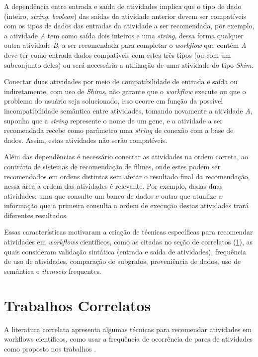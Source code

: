 \documentclass{acm_proc_article-sp}
\begin{document}
A depend{\^e}ncia entre entrada e sa{\'i}da de atividades implica que o tipo de dado (inteiro, \emph{string}, \emph{boolean}) das sa{\'i}das da atividade anterior devem ser compat{\'i}veis com os tipos de dados das entradas da atividade a ser recomendada, por exemplo, a atividade \emph{A} tem como sa{\'i}da dois inteiros e uma \emph{string}, dessa forma qualquer outra atividade \emph{B}, a ser recomendada para completar o \emph{workflow} que cont{\'e}m \emph{A} deve ter como entrada dados compat{\'i}veis com estes tr{\^e}s tipos (ou com um subconjunto deles) ou ser{\'a} necess{\'a}ria a utiliza\c{c}{\~a}o de uma atividade do tipo \emph{Shim}.

Conectar duas atividades por meio de compatibilidade de entrada e sa{\'i}da ou indiretamente, com uso de \emph{Shims}, n{\~a}o garante que o \emph{workflow} execute ou que o problema do usu{\'a}rio seja solucionado, isso ocorre em fun\c{c}{\~a}o da poss{\'i}vel incompatibilidade sem{\^a}ntica entre atividades, tomando novamente a atividade \emph{A}, suponha que a \emph{string} represente o nome de um gene, e a atividade a ser recomendada recebe como par{\^a}metro uma \emph{string} de conex{\~a}o com a base de dados. Assim, estas atividades n{\~a}o ser{\~a}o compat{\'i}veis.

Al{\'e}m das depend{\^e}ncias {\'e} necess{\'a}rio conectar as atividades na ordem correta, ao contr{\'a}rio de sistemas de recomenda\c{c}{\~a}o de filmes, onde estes podem ser recomendados em ordens distintas sem afetar o resultado final da recomenda\c{c}{\~a}o, nessa {\'a}rea a ordem das atividades {\'e} relevante. Por exemplo, dadas duas atividades: uma que consulte um banco de dados e outra que atualize a informa\c{c}{\~a}o que a primeira consulta a ordem de execu\c{c}{\~a}o destas atividades trar{\'a} diferentes resultados.

Essas caracter{\'i}sticas motivaram a cria\c{c}{\~a}o de t{\'e}cnicas espec{\'i}ficas para recomendar atividades em \emph{workflows} cient{\'i}ficos, como as citadas no se\c{c}{\~a}o de correlatos (\ref{CORRELATOS}), as quais consideram  valida\c{c}{\~a}o sint{\'a}tica (entrada e sa{\'i}da de atividades), frequ{\^e}ncia de uso de atividades, compara\c{c}{\~a}o de subgrafos, proveni{\^e}ncia de dados, uso de sem{\^a}ntica e \emph{itemsets} frequentes.

\section{Trabalhos Correlatos}\label{CORRELATOS}
A literatura correlata apresenta algumas t{\'e}cnicas para recomendar atividades em workflows cient{\'i}ficos, como usar a frequ{\^e}ncia de ocorr{\^e}ncia de pares de atividades como proposto nos trabalhos \cite{TELEA13, VINCA4Science07, Grafo12, diamantini_mining_2012, Zhang2011, Zhang2014}.
\end{document}
